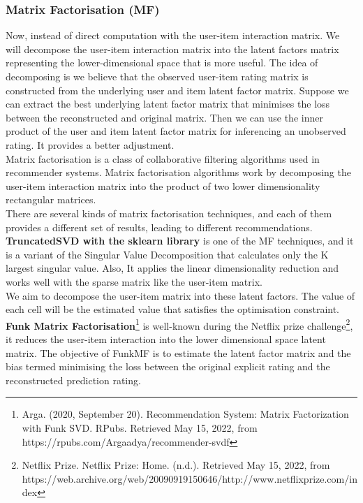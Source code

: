 \subsubsection{Matrix Factorisation (MF)}
\label{Matrix Factorisation}
Now, instead of direct computation with the user-item interaction matrix. We will decompose the user-item interaction matrix into the latent factors matrix representing the lower-dimensional space that is more useful. The idea of decomposing is we believe that the observed user-item rating matrix is constructed from the underlying user and item latent factor matrix. Suppose we can extract the best underlying latent factor matrix that minimises the loss between the reconstructed and original matrix. 
Then we can use the inner product of the user and item latent factor matrix for inferencing an unobserved rating. It provides a better adjustment.
\\Matrix factorisation is a class of collaborative filtering algorithms used in recommender systems. Matrix factorisation algorithms work by decomposing the user-item interaction matrix into the product of two lower dimensionality rectangular matrices.
\\There are several kinds of matrix factorisation techniques, and each of them provides a different set of results, leading to different recommendations.
\\ \textbf{TruncatedSVD with the sklearn library} is one of the MF techniques, and it is a variant of the Singular Value Decomposition that calculates only the K largest singular value. Also, It applies the linear dimensionality reduction and works well with the sparse matrix like the user-item matrix.
\\We aim to decompose the user-item matrix into these latent factors. The value of each cell will be the estimated value that satisfies the optimisation constraint.
\\\textbf{Funk Matrix Factorisation}\footnote{Arga. (2020, September 20). Recommendation System: Matrix Factorization with Funk SVD. RPubs. Retrieved May 15, 2022, from https://rpubs.com/Argaadya/recommender-svdf} is well-known during the Netflix prize challenge\footnote{Netflix Prize. Netflix Prize: Home. (n.d.). Retrieved May 15, 2022, from https://web.archive.org/web/20090919150646/http://www.netflixprize.com/index}, it reduces the user-item interaction into the lower dimensional space latent matrix. The objective of FunkMF is to estimate the latent factor matrix and the bias termed minimising the loss between the original explicit rating and the reconstructed prediction rating.

